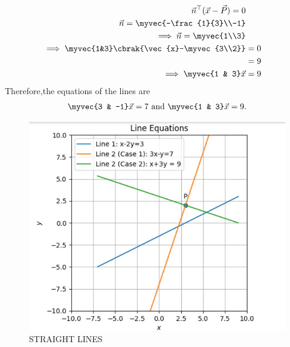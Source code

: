 \begin{align}
\vec{n}^{\top} ({\vec{x}-\vec{P}}) = 0\\
{\vec{n}}=\myvec{-\frac{1}{3}\\-1} \\
\implies {\vec{n}}=\myvec{1\\3} \\
\implies 
	\myvec{1&3}\cbrak{\vec{x}-\myvec{3\\2}}&=0\\
	&=9 \\
		\implies 	\myvec{1 & 3}\vec{x} &= 9
\end{align}
Therefore,the equations of the lines are 
\begin{align}
	\myvec{3 & -1}\vec{x} = 7  \text{ and }   \myvec{1 & 3}\vec{x} = 9 .
\end{align}
\begin{figure}[!ht]
\centering
\includegraphics[width=\columnwidth]{chapters/11/10/4/11/figs/strline.jpg}
\caption{STRAIGHT LINES}
\label{fig:chapters/11/10/4/11/figs/strline.jpg}
\end{figure}
